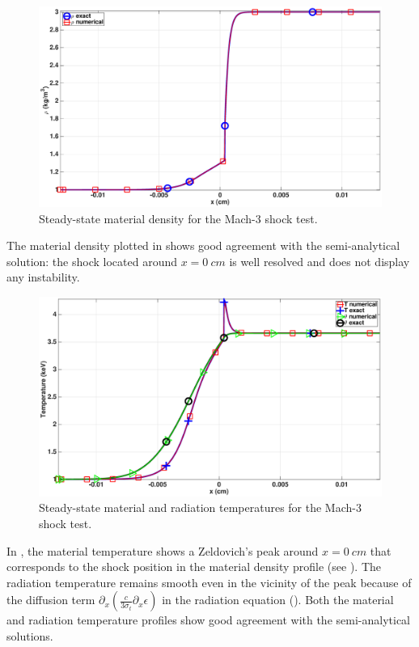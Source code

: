 \documentclass[times,doublespace]{fldauth}%
\begin{document}
\begin{figure}[H]
    \centering
    \includegraphics[width=\textwidth]{figures/cst-xs/mach_3_cst_xs_nel_1000_density.eps}
    \caption{Steady-state material density for the Mach-3 shock test.}\label{fig:mach-3-cst-xs-dens}
\end{figure}
%
The material density plotted in  shows good agreement with the semi-analytical solution: the shock located around $x=0 \ cm$ is well resolved and does not display any instability.
%
\begin{figure}[H]
    \centering
    \includegraphics[width=\textwidth]{figures/cst-xs/mach_3_cst_xs_nel_1000_temperature.eps}
    \caption{Steady-state material and radiation temperatures for the Mach-3 shock test.}\label{fig:mach-3-cst-xs-temp}
\end{figure}
%
In , the material temperature shows a Zeldovich's peak around $x=0 \ cm$ that corresponds to the shock position in the material density profile (see ). The radiation temperature remains smooth even in the vicinity of the peak because of the diffusion term $ \partial_x \left( \frac{c}{3 \sigma_t} \partial_x \epsilon \right)$ in the radiation equation (). Both the material and radiation temperature profiles show good agreement with the semi-analytical solutions.
\end{document}
